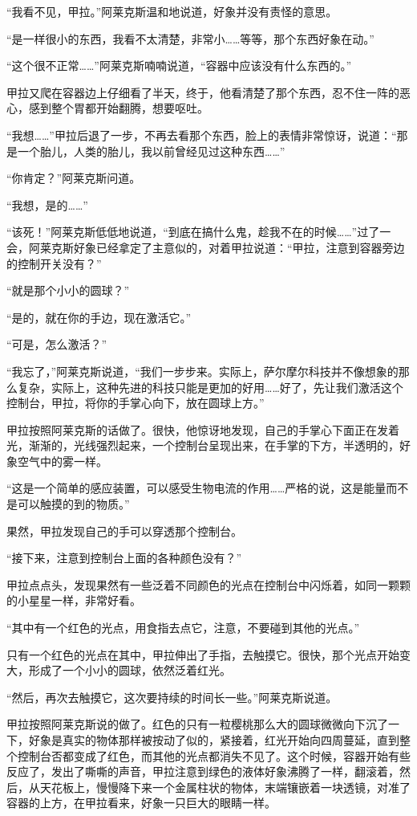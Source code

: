 “我看不见，甲拉。”阿莱克斯温和地说道，好象并没有责怪的意思。 

“是一样很小的东西，我看不太清楚，非常小……等等，那个东西好象在动。” 

“这个很不正常……”阿莱克斯喃喃说道，“容器中应该没有什么东西的。” 

甲拉又爬在容器边上仔细看了半天，终于，他看清楚了那个东西，忍不住一阵的恶心，感到整个胃都开始翻腾，想要呕吐。 

“我想……”甲拉后退了一步，不再去看那个东西，脸上的表情非常惊讶，说道：“那是一个胎儿，人类的胎儿，我以前曾经见过这种东西……” 

“你肯定？”阿莱克斯问道。 

“我想，是的……” 

“该死！”阿莱克斯低低地说道，“到底在搞什么鬼，趁我不在的时候……”过了一会，阿莱克斯好象已经拿定了主意似的，对着甲拉说道：“甲拉，注意到容器旁边的控制开关没有？” 

“就是那个小小的圆球？” 

“是的，就在你的手边，现在激活它。” 

“可是，怎么激活？” 

“我忘了，”阿莱克斯说道，“我们一步步来。实际上，萨尔摩尔科技并不像想象的那么复杂，实际上，这种先进的科技只能是更加的好用……好了，先让我们激活这个控制台，甲拉，将你的手掌心向下，放在圆球上方。” 

甲拉按照阿莱克斯的话做了。很快，他惊讶地发现，自己的手掌心下面正在发着光，渐渐的，光线强烈起来，一个控制台呈现出来，在手掌的下方，半透明的，好象空气中的雾一样。 

“这是一个简单的感应装置，可以感受生物电流的作用……严格的说，这是能量而不是可以触摸的到的物质。” 

果然，甲拉发现自己的手可以穿透那个控制台。 

“接下来，注意到控制台上面的各种颜色没有？” 

甲拉点点头，发现果然有一些泛着不同颜色的光点在控制台中闪烁着，如同一颗颗的小星星一样，非常好看。 

“其中有一个红色的光点，用食指去点它，注意，不要碰到其他的光点。” 

只有一个红色的光点在其中，甲拉伸出了手指，去触摸它。很快，那个光点开始变大，形成了一个小小的圆球，依然泛着红光。 

“然后，再次去触摸它，这次要持续的时间长一些。”阿莱克斯说道。 

甲拉按照阿莱克斯说的做了。红色的只有一粒樱桃那么大的圆球微微向下沉了一下，好象是真实的物体那样被按动了似的，紧接着，红光开始向四周蔓延，直到整个控制台否都变成了红色，而其他的光点都消失不见了。这个时候，容器开始有些反应了，发出了嘶嘶的声音，甲拉注意到绿色的液体好象沸腾了一样，翻滚着，然后，从天花板上，慢慢降下来一个金属柱状的物体，末端镶嵌着一块透镜，对准了容器的上方，在甲拉看来，好象一只巨大的眼睛一样。 

